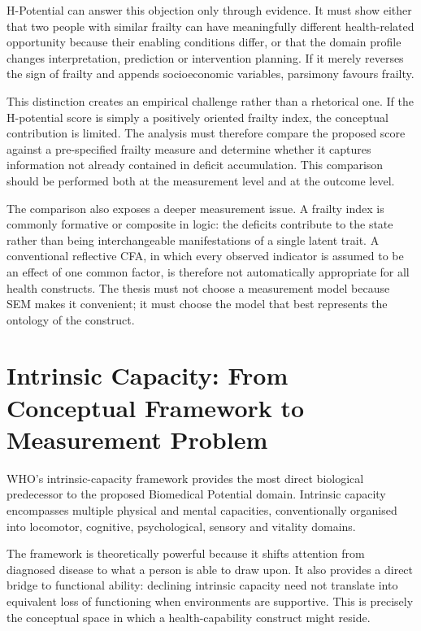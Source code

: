H-Potential can answer this objection only through evidence. It must show either
that two people with similar frailty can have meaningfully different
health-related opportunity because their enabling conditions differ, or that
the domain profile changes interpretation, prediction or intervention planning.
If it merely reverses the sign of frailty and appends socioeconomic variables,
parsimony favours frailty.

This distinction creates an empirical challenge rather than a rhetorical one. If the H-potential score is simply a positively oriented frailty index, the conceptual contribution is limited. The analysis must therefore compare the proposed score against a pre-specified frailty measure and determine whether it captures information not already contained in deficit accumulation. This comparison should be performed both at the measurement level and at the outcome level.

The comparison also exposes a deeper measurement issue. A frailty index is commonly formative or composite in logic: the deficits contribute to the state rather than being interchangeable manifestations of a single latent trait. A conventional reflective CFA, in which every observed indicator is assumed to be an effect of one common factor, is therefore not automatically appropriate for all health constructs. The thesis must not choose a measurement model because SEM makes it convenient; it must choose the model that best represents the ontology of the construct.

\section{Intrinsic Capacity: From Conceptual Framework to Measurement Problem}

WHO's intrinsic-capacity framework provides the most direct biological predecessor to the proposed Biomedical Potential domain. Intrinsic capacity encompasses multiple physical and mental capacities, conventionally organised into locomotor, cognitive, psychological, sensory and vitality domains. \cite{who_intrinsic_capacity_2017,beard_intrinsic_2019}

The framework is theoretically powerful because it shifts attention from diagnosed disease to what a person is able to draw upon. It also provides a direct bridge to functional ability: declining intrinsic capacity need not translate into equivalent loss of functioning when environments are supportive. \cite{who_2015_ageing,who_healthy_ageing_2026} This is precisely the conceptual space in which a health-capability construct might reside.

